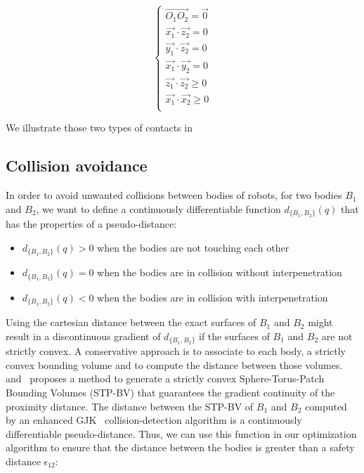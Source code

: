 \begin{equation}
\label{eq:fixed_contact}
\boxed{\left\{
  \begin{array}{l}
    \overrightarrow{O_1O_2} = \vec{0}\\
    \vec{x_1}\cdot\vec{z_2} = 0\\
    \vec{y_1}\cdot\vec{z_2} = 0\\
    \vec{x_1}\cdot\vec{y_2} = 0\\
    \vec{z_1}\cdot\vec{z_2} \geq 0\\
    \vec{x_1}\cdot\vec{x_2} \geq 0\\
  \end{array}
  \right.}
\end{equation}

We illustrate those two types of contacts in~



\subsection{Collision avoidance}
\label{sub:collision_avoidance}


In order to avoid unwanted collisions between bodies of robots, for two bodies $B_1$ and $B_2$, we want to define a continuously differentiable function $d_{\{B_1, B_2\}}(q)$ that has the properties of a pseudo-distance:
\begin{itemize}
  \item $d_{\{B_1, B_2\}}(q) > 0$ when the bodies are not touching each other
  \item $d_{\{B_1, B_2\}}(q) = 0$ when the bodies are in collision without interpenetration
  \item $d_{\{B_1, B_2\}}(q) < 0$ when the bodies are in collision with interpenetration
\end{itemize}

Using the cartesian distance between the exact surfaces of $B_1$ and $B_2$ might result in a discontinuous gradient of $d_{\{B_1, B_2\}}$ if the surfaces of $B_1$ and $B_2$ are not strictly convex.
A conservative approach is to associate to each body, a strictly convex bounding volume and to compute the distance between those volumes.
\cite{escande:humanoids:2007} and~\cite{escande:itro:2014} proposes a method to generate a strictly convex Sphere-Torus-Patch Bounding Volumes (STP-BV) that guarantees the gradient continuity of the proximity distance.
The distance between the STP-BV of $B_1$ and $B_2$ computed by an enhanced GJK~\cite{gilbert-1988a} collision-detection algorithm is a continuously differentiable pseudo-distance.
Thus, we can use this function in our optimization algorithm to ensure that the distance between the bodies is greater than a safety distance $\epsilon_{12}$:

